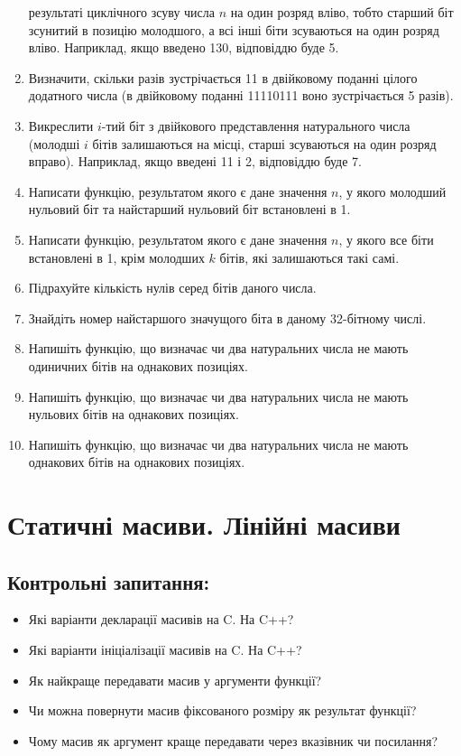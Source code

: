 \documentclass[a5paper,titlepage,openany,twoside,draft]{book_unv}%
\begin{document}
\begin{enumerate}
  результаті циклічного зсуву числа $n$ на один розряд вліво, тобто
  старший біт зсунитий в позицію молодшого, а всі інші біти зсуваються
  на один розряд вліво. Наприклад, якщо введено 130, відповіддю буде 5.
\item
  Визначити, скільки разів зустрічається 11 в двійковому поданні цілого
  додатного числа (в двійковому поданні 11110111 воно зустрічається 5
  разів).
\item
  Викреслити $i$-тий біт з двійкового представлення натурального числа
  (молодші $i$ бітів залишаються на місці, старші зсуваються на один
  розряд вправо). Наприклад, якщо введені 11 і 2, відповіддю буде 7.
\item
  Написати функцію, результатом якого є дане значення $n$, у якого 
молодший нульовий біт та найстарший нульовий біт встановлені в 1.
\item
  Написати функцію, результатом якого є дане значення $n$, у якого все
  біти встановлені в 1, крім молодших $k$ бітів, які залишаються такі самі.
\item
  Підрахуйте кількість нулів серед бітів даного числа.
\item
  Знайдіть номер найстаршого значущого біта в даному 32-бітному числі.
\item
  Напишіть функцію, що визначає чи два натуральних числа не мають
  одиничних бітів на однакових позиціях.
\item
  Напишіть функцію, що визначає чи два натуральних числа не мають
  нульових бітів на однакових позиціях.
\item
  Напишіть функцію, що визначає чи два натуральних числа не мають
  однакових бітів на однакових позиціях.
\end{enumerate}


\chapter{ Статичні масиви. Лінійні масиви }
%

\section{Контрольні запитання:}
\begin{itemize}
\item
  Які варіанти декларації масивів на C. На C++?
\item
  Які варіанти ініціалізації масивів на C. На C++?
\item
  Як найкраще передавати масив у аргументи функції?
\item
  Чи можна повернути масив фіксованого розміру як результат функції?
\item
  Чому масив як аргумент краще передавати через вказівник чи посилання?

\end{itemize}
\end{document}
